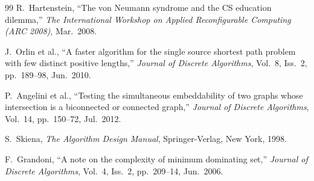 \documentclass[11pt]{article}
\begin{document}
\begin{thebibliography}{99}
R.~Hartenstein,
``The von Neumann syndrome and the CS education dilemma,''
\textit{The International Workshop on Applied Reconfigurable Computing (ARC 2008)},
Mar.~2008.

J.~Orlin et al.,
``A faster algorithm for the single source shortest path problem with few distinct positive lengths,''
\textit{Journal of Discrete Algorithms},
Vol.~8, Iss.~2, pp.~189--98, Jun.~2010.

P.~Angelini et al.,
``Testing the simultaneous embeddability of two graphs whose intersection is a biconnected or connected graph,''
\textit{Journal of Discrete Algorithms},
Vol.~14, pp.~150--72, Jul.~2012.

S.~Skiena,
\textit{The Algorithm Design Manual},
Springer-Verlag, New York, 1998.

F.~Grandoni,
``A note on the complexity of minimum dominating set,''
\textit{Journal of Discrete Algorithms},
Vol.~4, Iss.~2, pp.~209--14, Jun.~2006.

\end{thebibliography}
\end{document}
